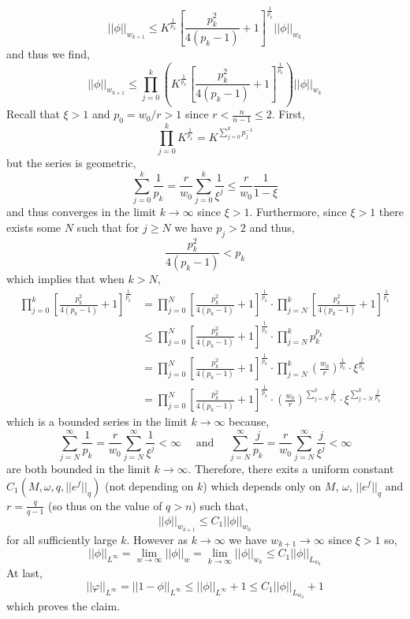 \documentclass[12pt]{extarticle}
\theoremstyle{definition}
\begin{document}
\[ || \phi ||_{w_{k + 1}} \le K^{\frac{1}{p_k}} \left[ \frac{p_k^2}{4(p_k - 1)} + 1 \right]^{\frac{1}{p_k}} || \phi ||_{w_k} \]
and thus we find,
\[ || \phi ||_{w_{k+1}} \le \prod_{j = 0}^k \left( K^{\frac{1}{p_k}} \left[ \frac{p_k^2}{4(p_k - 1)} + 1 \right]^{\frac{1}{p_k}} \right) || \phi ||_{w_k} \]
Recall that $\xi > 1$ and $p_0 = w_0 / r > 1$ since $r < \frac{n}{n-1} \le 2$. First,
\[ \prod_{j = 0}^k K^{\frac{1}{p_k}} = K^{\sum\limits_{j = 0}^k p_j^{-1}} \]
but the series is geometric,
\[ \sum_{j = 0}^k \frac{1}{p_k} = \frac{r}{w_0} \sum_{j = 0}^k \frac{1}{\xi^j} \le \frac{r}{w_0} \frac{1}{1 - \xi} \]
and thus converges in the limit $k \to \infty$ since $\xi > 1$. Furthermore, since $\xi > 1$ there exists some $N$ such that for $j \ge N$ we have $p_j > 2$ and thus,
\[ \frac{p_k^2}{4(p_k - 1)} < p_k \] 
which implies that when $k > N$,
\begin{align*}
\prod_{j = 0}^k \left[ \frac{p_k^2}{4(p_k - 1)} + 1 \right]^{\frac{1}{p_k}} & = \prod_{j = 0}^N \left[ \frac{p_k^2}{4(p_k - 1)} + 1 \right]^{\frac{1}{p_k}} \cdot \prod_{j = N}^k \left[ \frac{p_k^2}{4(p_k - 1)} + 1 \right]^{\frac{1}{p_k}}
\\
&  \le \prod_{j = 0}^N \left[ \frac{p_k^2}{4(p_k - 1)} + 1 \right]^{\frac{1}{p_k}} \cdot \prod_{j = N}^k p_k^{p_k}
\\
& = \prod_{j = 0}^N \left[ \frac{p_k^2}{4(p_k - 1)} + 1 \right]^{\frac{1}{p_k}} \cdot \prod_{j = N}^k \left( \frac{w_0}{r} \right)^{\frac{1}{p_k}} \cdot \xi^{\frac{j}{p_k}}
\\
& = \prod_{j = 0}^N \left[ \frac{p_k^2}{4(p_k - 1)} + 1 \right]^{\frac{1}{p_k}} \cdot \left( \frac{w_0}{r} \right)^{\sum\limits_{j = N}^k \frac{1}{p_k}} \cdot \xi^{\sum\limits_{j = N}^k \frac{j}{p_k}}
\end{align*}
which is a bounded series in the limit $k \to \infty$ because,
\[ \sum_{j = N}^\infty \frac{1}{p_k} = \frac{r}{w_0} \sum_{j = N}^\infty \frac{1}{\xi^j} < \infty \quad \text{ and } \quad \sum_{j = N}^\infty \frac{j}{p_k} = \frac{r}{w_0} \sum_{j = N}^\infty \frac{j}{\xi^j} < \infty \]
are both bounded in the limit $k \to \infty$. Therefore, there exits a uniform constant $C_1(M, \omega, q, || e^f ||_q)$ (not depending on $k$) which depends only on $M$, $\omega$, $|| e^f ||_q$ and $r = \frac{q}{q - 1}$ (so thus on the value of $q > n$) such that,
\[ || \phi ||_{w_{k+1}} \le C_1 || \phi ||_{w_0} \]
for all sufficiently large $k$. However as $k \to \infty$ we have $w_{k + 1} \to \infty$ since $\xi > 1$ so,
\[ || \phi ||_{L^\infty} = \lim_{w \to \infty} || \phi ||_w = \lim_{k \to \infty} || \phi ||_{w_k} \le C_1 || \phi ||_{L_{w_0}} \]
At last,
\[ || \varphi ||_{L^\infty} = || 1 - \phi ||_{L^\infty} \le || \phi ||_{L^\infty} + 1 \le C_1 || \phi ||_{L_{w_0}} + 1 \]
which proves the claim.
\end{document}
